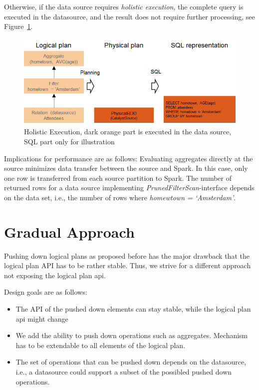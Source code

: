 \documentclass{article}
\begin{document}
Otherwise, if the data source requires \textit{holistic execution}, the complete query is executed in the datasource, and the result does not require further processing, see Figure~\ref{fig:holisticxecution}.

\begin{figure}[htp]
\centering
  \includegraphics[width=1.0\textwidth]{images/holisticExecution.png}
  \caption{Holistic Execution, dark orange part is executed in the data source, SQL part only for illustration}
  \label{fig:holisticxecution}
\end{figure}

Implications for performance are as follows: Evaluating aggregates directly at the source minimizes data transfer between the source and Spark. In this case, only one row is transferred from each source partition to Spark. The number of returned rows for a data source implementing \textit{PrunedFilterScan}-interface depends on the data set, i.e., the number of rows where \textit{homewtown = `Amsterdam'}.

\section{Gradual Approach}

Pushing down logical plans as proposed before has the major drawback that the logical plan API has to be rather stable. Thus, we strive for a different approach not exposing the logical plan api.

Design goals are as follows:

\begin{itemize}
  \item The API of the pushed down elements can stay stable, while the logical plan api might change
  \item We add the ability to push down  operations such as aggregates. Mechanism has to be extendable to all elements of the logical plan.
  \item The set of operations that can be pushed down depends on the datasource, i.e., a datasource could support a subset of the possibled pushed down operations.
\end{itemize}
\end{document}
